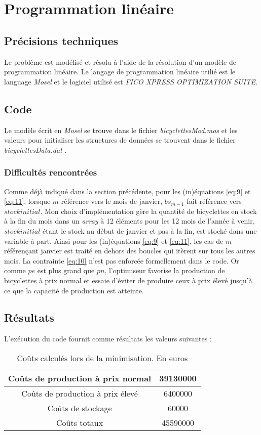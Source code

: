 \documentclass[11pt,a4paper]{report}
\begin{document}
\section*{Programmation linéaire}
\subsection*{Précisions techniques}
Le problème est modélisé et résolu à l'aide de la résolution d'un modèle de programmation linéaire. Le langage de programmation linéaire utilié est le language \textit{Mosel} et le logiciel utilisé est \textit{FICO XPRESS OPTIMIZATION SUITE}.
\subsection*{Code}
Le modèle écrit en \textit{Mosel} se trouve dans le fichier \og \textit{bicyclettesMod.mos}  \fg{} et les valeurs pour initialiser les structures de données se trouvent dans le fichier \og \textit{bicyclettesData.dat} \fg{}.
\subsubsection*{Difficultés rencontrées}
Comme déjà indiqué dans la section précédente, pour les (in)équations \eqref{eq:9} et \eqref{eq:11}, lorsque $m$ référence vers le mois de janvier, $bs_{m-1}$ fait référence vers $stockinitial$. Mon choix d'implémentation gère la quantité de bicyclettes en stock à la fin du mois dans un \textit{array} à 12 éléments pour les 12 mois de l'année à venir, $stockinitial$ étant le stock au début de janvier et pas à la fin, est stocké dans une variable à part. Ainsi pour les (in)équations \eqref{eq:9} et \eqref{eq:11}, les cas de $m$ référençant janvier est traité en dehors des boucles qui itèrent sur tous les autres mois.\newline
La contrainte \eqref{eq:10} n'est pas enforcée formellement dans le code. Or comme $pe$ est plus grand que $pn$, l'optimiseur favorise la production de bicyclettes à prix normal et essaie d'éviter de produire ceux à prix élevé jusqu'à ce que la capacité de production est atteinte.
\subsection*{Résultats}
L'exécution du code fournit comme résultats les valeurs suivantes :
\begin{table}[h]
\centering
\caption{Coûts calculés lors de la minimisation. En euros}
\begin{tabular}{ |c |c|}
\hline
 Coûts de production à prix normal & 39130000   \\
 \hline
 Coûts de production à prix élevé & 6400000 \\  
 \hline
  Coûts de stockage &   60000 \\
 \hline
   Coûts totaux & 45590000   \\
 \hline
\end{tabular}
\end{table}
\end{document}
